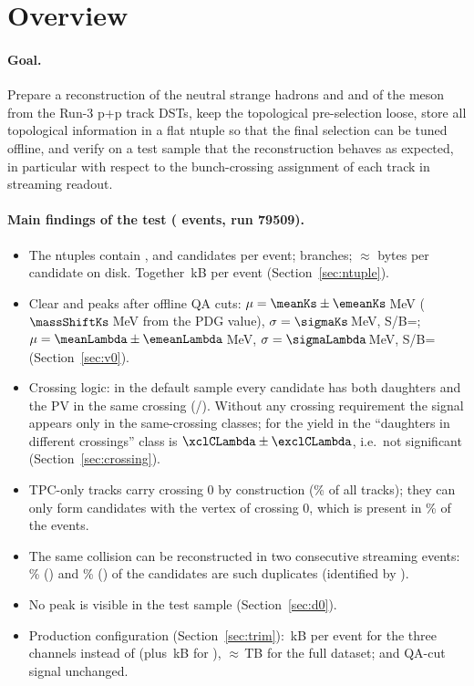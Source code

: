 \section{Overview}
\label{sec:overview}

\paragraph{Goal.} Prepare a reconstruction of the neutral strange hadrons \Ks{} and \Lam{} and
of the \Dzero{} meson from the Run-3 p+p track DSTs, keep the topological pre-selection loose,
store all topological information in a flat ntuple so that the final selection can be tuned
offline, and verify on a test sample that the reconstruction behaves as expected, in
particular with respect to the bunch-crossing assignment of each track in streaming readout.

\paragraph{Main findings of the test (\nEvents{} events, run 79509).}
\begin{itemize}\setlength\itemsep{1pt}
\item The ntuples contain \candPerEvKs{} \Ks, \candPerEvLambda{} \Lam{} and \candPerEvDzero{}
  \Dzero{} candidates per event; \nBranchKs{} branches; $\approx$\BPerCandKs{} bytes per
  candidate on disk. Together \kBPerEvProd{}\,kB per event (Section~\ref{sec:ntuple}).
\item Clear \Ks{} and \Lam{} peaks after offline QA cuts: \Ks{} $\mu=\meanKs\pm\emeanKs$\,MeV
  ($\massShiftKs$\,MeV from the PDG value), $\sigma=\sigmaKs$\,MeV, S/B=\SBKs;
  \Lam{} $\mu=\meanLambda\pm\emeanLambda$\,MeV, $\sigma=\sigmaLambda$\,MeV, S/B=\SBLambda{}
  (Section~\ref{sec:v0}).
\item Crossing logic: in the default sample every candidate has both daughters and the PV in the
  same crossing (\checkXKs/\checkXLambda). Without any crossing requirement the \Ks{} signal
  appears only in the same-crossing classes; for \Lam{} the yield in the
  ``daughters in different crossings'' class is $\xclCLambda\pm\exclCLambda$, i.e.\ not
  significant (Section~\ref{sec:crossing}).
\item TPC-only tracks carry crossing 0 by construction (\trkTPConlyFrac\% of all tracks); they
  can only form candidates with the vertex of crossing 0, which is present in
  \evVtxXzeroFrac\% of the events.
\item The same collision can be reconstructed in two consecutive streaming events:
  \dupFracKs\% (\Ks) and \dupFracLambda\% (\Lam) of the candidates are such duplicates
  (identified by ).
\item No \Dzero{} peak is visible in the test sample (Section~\ref{sec:d0}).
\item Production configuration (Section~\ref{sec:trim}): \trimKBDira\,kB per event for the three
  channels instead of \trimKBLoose{} (plus \trimEvInfoKB\,kB for ), $\approx$\trimTBDira\,TB
  for the full dataset; \Ks{} and \Lam{} QA-cut signal unchanged.
\end{itemize}

